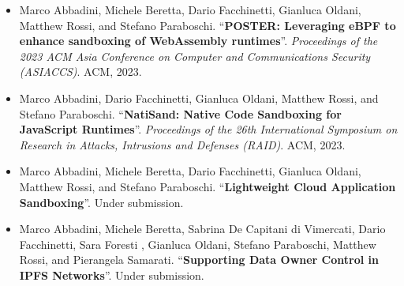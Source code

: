 \begin{itemize}
    \nocite{enhance-wasm-sandbox}
    \item Marco Abbadini, Michele Beretta, Dario Facchinetti, Gianluca
        Oldani, Matthew Rossi, and Stefano Paraboschi.
        ``\textbf{POSTER: Leveraging eBPF to enhance sandboxing of
        WebAssembly runtimes}''. {\em Proceedings of the 2023 ACM Asia
        Conference on Computer and Communications Security (ASIACCS)}.
        ACM, 2023.
    
    \nocite{natisand}
    \item Marco Abbadini, Dario Facchinetti, Gianluca Oldani, Matthew
        Rossi, and Stefano Paraboschi. ``\textbf{NatiSand: Native Code
        Sandboxing for JavaScript Runtimes}''. {\em Proceedings of the
        26th International Symposium on Research in Attacks,
        Intrusions and Defenses (RAID)}. ACM, 2023.

    \nocite{dmng}
    \item Marco Abbadini, Michele Beretta, Dario Facchinetti, Gianluca
        Oldani, Matthew Rossi, and Stefano Paraboschi.
        ``\textbf{Lightweight Cloud Application Sandboxing}''. Under
        submission.

    \nocite{freya-ipfs}
    \item Marco Abbadini, Michele Beretta, Sabrina De Capitani di
        Vimercati, Dario Facchinetti, Sara Foresti , Gianluca Oldani,
        Stefano Paraboschi, Matthew Rossi, and Pierangela Samarati.
        ``\textbf{Supporting Data Owner Control in IPFS Networks}''.
        Under submission.
\end{itemize}
